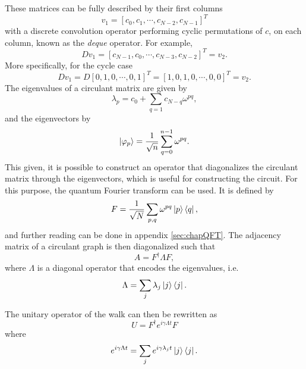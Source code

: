 \documentclass[../../dissertation.tex]{subfiles}
\begin{document}
These matrices can be fully described by their first columns 
\begin{equation}
	v_1 = [c_{0},c_{1}, \cdots, c_{N-2}, c_{N-1}]^T 
\end{equation}
with a discrete convolution operator performing cyclic permutations of $c$, on
each column, known as the \textit{deque} operator. For example,
\begin{equation}
	D v_1 = [c_{N-1}, c_{0}, \cdots, c_{N-3}, c_{N-2}]^T = v_2.
\end{equation}
More specifically, for the cycle case
\begin{equation}
	D v_1 = D [0, 1 ,0 , \cdots, 0, 1]^T =[1, 0, 1, 0, \cdots, 0, 0]^T = v_2.
\end{equation}
The eigenvalues of a circulant matrix are given by
\begin{equation}
\lambda_p = c_0 + \sum_{q=1} c_{N-q} \omega^{pq},
\end{equation}
and the eigenvectors by 
\begin{equation}
\ket{\varphi_p} = \frac{1}{\sqrt{n}} \sum_{q=0}^{n-1} \omega^{pq}.
\end{equation}
This given, it is possible to construct an operator that diagonalizes the
circulant matrix through the eigenvectors, which is useful for constructing the
circuit. For this purpose, the quantum Fourier transform can be used. It is
defined by 
\begin{equation}
F = \frac{1}{\sqrt{N}} \sum_{p,q} \omega^{pq} \ket{p}\bra{q},
\end{equation}
and further reading can be done in appendix \ref{sec:chapQFT}.
The adjacency matrix of a circulant graph is then diagonalized such that
\begin{equation}
    A = F^{\dagger} \Lambda F,
    \label{eq:qiskitContQWAdj}
\end{equation}
where $\Lambda$ is a diagonal operator that encodes the eigenvalues, i.e.
\begin{equation}
\Lambda = \sum_{j} \lambda_j \ket{j}\bra{j}.
\end{equation}\par
The unitary operator of the walk can then be rewritten as
\begin{equation}\label{eq:diagUniOpCont}
    U = F^{\dagger}e^{i\gamma \Lambda t} F
\end{equation}
where
\begin{equation}
    e^{i\gamma \Lambda t} = \sum_{j} e^{i\gamma \lambda_j t} \ket{j}\bra{j}.
\end{equation}
\end{document}
